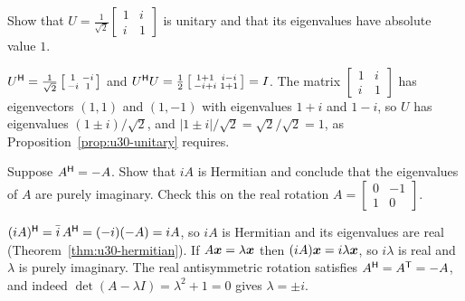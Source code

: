 \begin{exercise}\label{exr:u30-unitary}
Show that $U=\frac{1}{\sqrt2}\left[\begin{smallmatrix}1&i\\i&1\end{smallmatrix}\right]$ is unitary
and that its eigenvalues have absolute value $1$.
\end{exercise}
\begin{solution}
$U^{\mathsf{H}}=\frac1{\sqrt2}\left[\begin{smallmatrix}1&-i\\-i&1\end{smallmatrix}\right]$ and
$U^{\mathsf{H}} U=\frac12\left[\begin{smallmatrix}1+1&i-i\\-i+i&1+1\end{smallmatrix}\right]=I$. The matrix
$\left[\begin{smallmatrix}1&i\\i&1\end{smallmatrix}\right]$ has eigenvectors $(1,1)$ and $(1,-1)$ with
eigenvalues $1+i$ and $1-i$, so $U$ has eigenvalues $(1\pm i)/\sqrt2$, and
$|1\pm i|/\sqrt2=\sqrt2/\sqrt2=1$, as Proposition~\ref{prop:u30-unitary} requires.
\end{solution}

\begin{exercise}\label{exr:u30-skew}
Suppose $A^{\mathsf{H}}=-A$. Show that $iA$ is Hermitian and conclude that the eigenvalues of $A$ are purely
imaginary. Check this on the real rotation $A=\left[\begin{smallmatrix}0&-1\\1&0\end{smallmatrix}\right]$.
\end{exercise}
\begin{solution}
$(iA)^{\mathsf{H}}=\bar i\,A^{\mathsf{H}}=(-i)(-A)=iA$, so $iA$ is Hermitian and its eigenvalues are real
(Theorem~\ref{thm:u30-hermitian}). If $A\boldsymbol{x}=\lambda\boldsymbol{x}$ then $(iA)\boldsymbol{x}=i\lambda\boldsymbol{x}$, so $i\lambda$ is real
and $\lambda$ is purely imaginary. The real antisymmetric rotation satisfies
$A^{\mathsf{H}}=A^{\mathsf{T}}=-A$, and indeed $\det(A-\lambda I)=\lambda^2+1=0$ gives $\lambda=\pm i$.
\end{solution}
